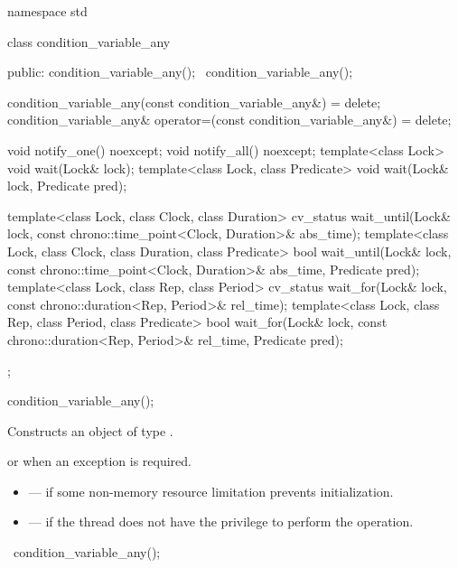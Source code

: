 %
\begin{codeblock}
namespace std {
  class condition_variable_any {
  public:
    condition_variable_any();
    ~condition_variable_any();

    condition_variable_any(const condition_variable_any&) = delete;
    condition_variable_any& operator=(const condition_variable_any&) = delete;

    void notify_one() noexcept;
    void notify_all() noexcept;
    template<class Lock>
      void wait(Lock& lock);
    template<class Lock, class Predicate>
      void wait(Lock& lock, Predicate pred);

    template<class Lock, class Clock, class Duration>
      cv_status wait_until(Lock& lock, const chrono::time_point<Clock, Duration>& abs_time);
    template<class Lock, class Clock, class Duration, class Predicate>
      bool wait_until(Lock& lock, const chrono::time_point<Clock, Duration>& abs_time,
                      Predicate pred);
    template<class Lock, class Rep, class Period>
      cv_status wait_for(Lock& lock, const chrono::duration<Rep, Period>& rel_time);
    template<class Lock, class Rep, class Period, class Predicate>
      bool wait_for(Lock& lock, const chrono::duration<Rep, Period>& rel_time, Predicate pred);
  };
}
\end{codeblock}

%
\begin{itemdecl}
condition_variable_any();
\end{itemdecl}

\begin{itemdescr}
\pnum
\effects Constructs an object of type .

\pnum
\throws {} or  when an exception is
required.

\pnum
\errors
\begin{itemize}
\item {} --- if some non-memory resource
limitation prevents initialization.

\item {} --- if the thread does not have the
privilege to perform the operation.
\end{itemize}
\end{itemdescr}

%
\begin{itemdecl}
~condition_variable_any();
\end{itemdecl}

